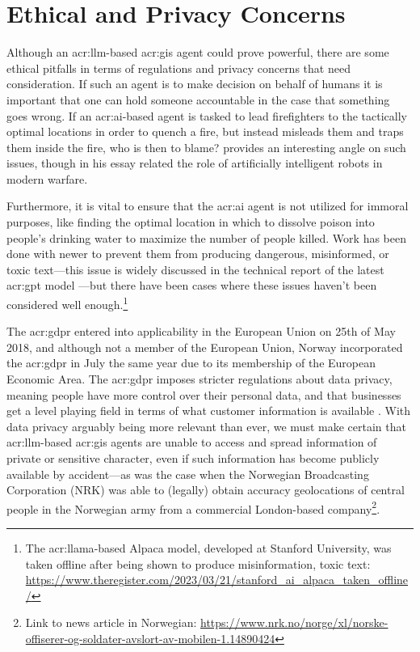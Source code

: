 \section{Ethical and Privacy Concerns}\label{sec:ethical-and-privacy-concerns}

Although an \acrshort{acr:llm}-based \acrshort{acr:gis} agent could prove powerful, there are some ethical pitfalls in terms of regulations and privacy concerns that need consideration. If such an agent is to make decision on behalf of humans it is important that one can hold someone accountable in the case that something goes wrong. If an \acrshort{acr:ai}-based agent is tasked to lead firefighters to the tactically optimal locations in order to quench a fire, but  instead misleads them and traps them inside the fire, who is then to blame? \cite{sparrowKillerRobots2007} provides an interesting angle on such issues, though in his essay related the role of artificially intelligent robots in modern warfare.

Furthermore, it is vital to ensure that the \acrshort{acr:ai} agent is not utilized for immoral purposes, like finding the optimal location in which to dissolve poison into people's drinking water to maximize the number of people killed. Work has been done with newer  to prevent them from producing dangerous, misinformed, or toxic text---this issue is widely discussed in the technical report of the latest \acrshort{acr:gpt} model \citep[11-14]{openaiGPT4TechnicalReport2023}---but there have been cases where these issues haven't been considered well enough.\footnote{The \acrshort{acr:llama}-based Alpaca model, developed at Stanford University, was taken offline after being shown to produce misinformation, toxic text: \url{https://www.theregister.com/2023/03/21/stanford_ai_alpaca_taken_offline/}}

The \gls{acr:gdpr} entered into applicability in the European Union on 25th of May 2018, and although not a member of the European Union, Norway incorporated the \gls{acr:gdpr} in July the same year due to its membership of the European Economic Area. The \gls{acr:gdpr} imposes stricter regulations about data privacy, meaning people have more control over their personal data, and that businesses get a level playing field in terms of what customer information is available \citep{datatilsynetGeneralDataProtection}. With data privacy arguably being more relevant than ever, we must make certain that \acrshort{acr:llm}-based \acrshort{acr:gis} agents are unable to access and spread information of private or sensitive character, even if such information has become publicly available by accident---as was the case when the Norwegian Broadcasting Corporation (NRK) was able to (legally) obtain accuracy geolocations of central people in the Norwegian army from a commercial London-based company\footnote{Link to news article in Norwegian: \url{https://www.nrk.no/norge/xl/norske-offiserer-og-soldater-avslort-av-mobilen-1.14890424}}.

\glsresetall